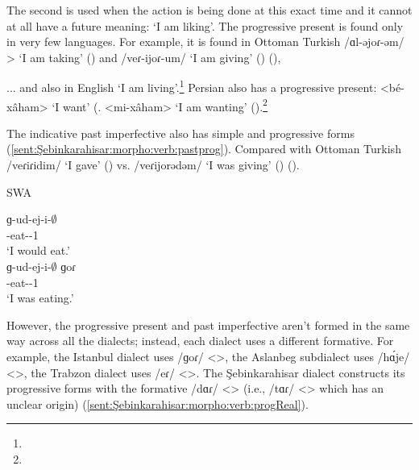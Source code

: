 The second is used when the action is being done at this exact time and it cannot at all have a future meaning: `I am liking'. The progressive present is found only in very few languages. For example, it is found in Ottoman Turkish /ɑl-əjoɾ-əm/ > `I am taking' () and /veɾ-ijoɾ-um/ `I am giving' () (),

\begin{adjarianpage}\label{page:175}\end{adjarianpage}%


... and also in English `I am living'.\footnote{} Persian also has a progressive present: <bé-xâham> `I want'  (. <mi-xâham> `I am wanting'  ().\footnote{}


The indicative past imperfective also has simple and progressive forms (\ref{sent:Şebinkarahisar:morpho:verb:pastprog}). Compared with Ottoman Turkish /veɾiɾidim/ `I gave' () vs. /veɾijorədəm/ `I was giving' () ().



\begin{exe}
	\ex SWA  \label{sent:Şebinkarahisar:morpho:verb:pastprog}
	\begin{xlist}
		\ex\gll ɡ-ud-ej-i-$\emptyset$\\
		{\ind}-eat-{\thgloss}-1{\sg} \\
		\trans `I would eat.' \\
		\ex\gll ɡ-ud-ej-i-$\emptyset$ ɡoɾ \\
		{\ind}-eat-{\thgloss}-1{\sg} {\prog} \\
		\trans `I was eating.' \\
	\end{xlist}
\end{exe}


However, the progressive present and past imperfective aren't formed in the same way across all the dialects; instead, each dialect uses a different formative. For example, the Istanbul dialect uses /ɡoɾ/ <>, the Aslanbeg subdialect uses /h\'ɑje/ <>, the Trabzon dialect uses /eɾ/ <>. The Şebinkarahisar dialect constructs its progressive forms with the formative /dɑɾ/ <> (i.e., /tɑɾ/ <> which has an unclear origin) (\ref{sent:Şebinkarahisar:morpho:verb:progReal}). 


